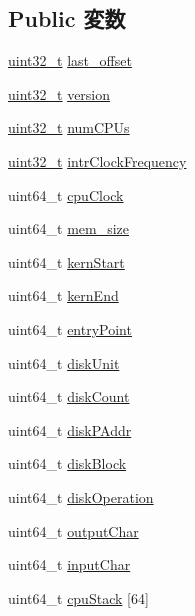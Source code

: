 \subsection*{Public 変数}
\begin{DoxyCompactItemize}
\item 
\hyperlink{Type_8hh_a435d1572bf3f880d55459d9805097f62}{uint32\_\-t} \hyperlink{structAlphaAccess_a589399e9f33ae0028f3868360bf5a665}{last\_\-offset}
\item 
\hyperlink{Type_8hh_a435d1572bf3f880d55459d9805097f62}{uint32\_\-t} \hyperlink{structAlphaAccess_acd99bb05ca015e7d74448acb1deba7ca}{version}
\item 
\hyperlink{Type_8hh_a435d1572bf3f880d55459d9805097f62}{uint32\_\-t} \hyperlink{structAlphaAccess_a62fe5772fdad74fda85b8510032153e0}{numCPUs}
\item 
\hyperlink{Type_8hh_a435d1572bf3f880d55459d9805097f62}{uint32\_\-t} \hyperlink{structAlphaAccess_a67afaa4123cf0004c80816f4a4622b68}{intrClockFrequency}
\item 
uint64\_\-t \hyperlink{structAlphaAccess_a1a28e6675c07a466d48206a22e992a0d}{cpuClock}
\item 
uint64\_\-t \hyperlink{structAlphaAccess_ae177731dc45fab0258bb6f72ebf37785}{mem\_\-size}
\item 
uint64\_\-t \hyperlink{structAlphaAccess_a031a9a2b7278c18413f2c17d8dd9d77c}{kernStart}
\item 
uint64\_\-t \hyperlink{structAlphaAccess_a6741af28865e38d678856e45e22a097e}{kernEnd}
\item 
uint64\_\-t \hyperlink{structAlphaAccess_a4425463a9d69b9f56bf1ac63c00d490d}{entryPoint}
\item 
uint64\_\-t \hyperlink{structAlphaAccess_a0374285e1002cc600d14cc247fd69f94}{diskUnit}
\item 
uint64\_\-t \hyperlink{structAlphaAccess_ab117d67754396b0fafd41fe5b8c9a806}{diskCount}
\item 
uint64\_\-t \hyperlink{structAlphaAccess_a95271ef36180e56020f8e5f3814ff64e}{diskPAddr}
\item 
uint64\_\-t \hyperlink{structAlphaAccess_a5faab42437acf9c9f2d137fdc52d3131}{diskBlock}
\item 
uint64\_\-t \hyperlink{structAlphaAccess_acbc96b4c47cd54efc8a5979bfb60f748}{diskOperation}
\item 
uint64\_\-t \hyperlink{structAlphaAccess_a0e8d6cc1d8754f3ca0765d5587997a57}{outputChar}
\item 
uint64\_\-t \hyperlink{structAlphaAccess_a648610dfd10a138f6e0897c45da0855c}{inputChar}
\item 
uint64\_\-t \hyperlink{structAlphaAccess_a42f441fefccfd9ff9dcc3535cccbc427}{cpuStack} \mbox{[}64\mbox{]}
\end{DoxyCompactItemize}


